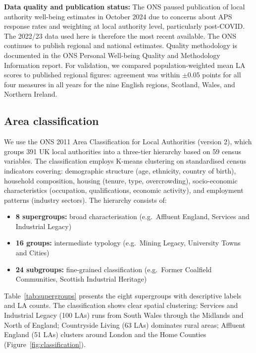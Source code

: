 \documentclass[12pt,a4paper]{article}
\begin{document}
\textbf{Data quality and publication status:} The ONS paused publication of local authority well-being estimates in October 2024 due to concerns about APS response rates and weighting at local authority level, particularly post-COVID. The 2022/23 data used here is therefore the most recent available. The ONS continues to publish regional and national estimates. Quality methodology is documented in the ONS Personal Well-being Quality and Methodology Information report. For validation, we compared population-weighted mean LA scores to published regional figures: agreement was within $\pm 0.05$ points for all four measures in all years for the nine English regions, Scotland, Wales, and Northern Ireland.

\subsection{Area classification}

We use the ONS 2011 Area Classification for Local Authorities (version 2), which groups 391 UK local authorities into a three-tier hierarchy based on 59 census variables. The classification employs K-means clustering on standardised census indicators covering: demographic structure (age, ethnicity, country of birth), household composition, housing (tenure, type, overcrowding), socio-economic characteristics (occupation, qualifications, economic activity), and employment patterns (industry sectors). The hierarchy consists of:

\begin{itemize}
\item \textbf{8 supergroups:} broad characterisation (e.g.\ Affluent England, Services and Industrial Legacy)
\item \textbf{16 groups:} intermediate typology (e.g.\ Mining Legacy, University Towns and Cities)
\item \textbf{24 subgroups:} fine-grained classification (e.g.\ Former Coalfield Communities, Scottish Industrial Heritage)
\end{itemize}

Table~\ref{tab:supergroups} presents the eight supergroups with descriptive labels and LA counts. The classification shows clear spatial clustering: Services and Industrial Legacy (100 LAs) runs from South Wales through the Midlands and North of England; Countryside Living (63 LAs) dominates rural areas; Affluent England (51 LAs) clusters around London and the Home Counties (Figure~\ref{fig:classification}).
\end{document}
